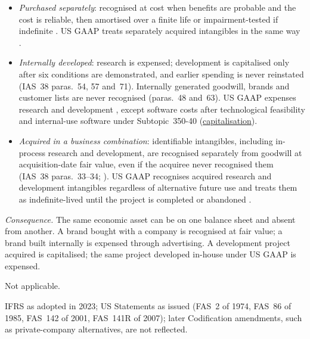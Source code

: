 \begin{qfmethod}\label{meth:intangible-acquisition-routes}
\begin{itemize}
\item \emph{Purchased separately}: recognised at cost when benefits are probable and the cost is reliable, then amortised over a finite life or impairment-tested if indefinite \citep[IAS~38 paras.~21, 97 and~107--108]{eu-2023-1803-ias38}. US GAAP treats separately acquired intangibles in the same way \citep[paras.~16--17]{us-goodwill-intangibles-2001}.
\item \emph{Internally developed}: research is expensed; development is capitalised only after six conditions are demonstrated, and earlier spending is never reinstated (IAS~38 paras.~54, 57 and~71). Internally generated goodwill, brands and customer lists are never recognised (paras.~48 and~63). US GAAP expenses research and development \citep[para.~12]{us-research-development-1974}, except software costs after technological feasibility \citep[paras.~3--4]{us-software-1985} and internal-use software under Subtopic~350-40 (\hyperref[meth:expense-recognition-capitalisation]{capitalisation}).
\item \emph{Acquired in a business combination}: identifiable intangibles, including in-process research and development, are recognised separately from goodwill at acquisition-date fair value, even if the acquiree never recognised them (IAS~38 paras.~33--34; \citep[IFRS~3 paras.~10, 18 and~B31]{eu-2023-1803-ifrs3}). US GAAP recognises acquired research and development intangibles regardless of alternative future use and treats them as indefinite-lived until the project is completed or abandoned \citep[para.~66(a), pp.~20--21]{us-business-combinations-2007}.
\end{itemize}

\emph{Consequence.} The same economic asset can be on one balance sheet and absent from another. A brand bought with a company is recognised at fair value; a brand built internally is expensed through advertising. A development project acquired is capitalised; the same project developed in-house under US GAAP is expensed.

 Not applicable.

 IFRS as adopted in 2023; US Statements as issued (FAS~2 of 1974, FAS~86 of 1985, FAS~142 of 2001, FAS~141R of 2007); later Codification amendments, such as private-company alternatives, are not reflected.


\end{qfmethod}
